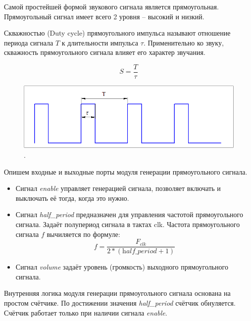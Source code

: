 Самой простейшей формой звукового сигнала является прямоугольная. Прямоугольный сигнал имеет всего 2 уровня -- высокий и низкий. 


Скважностью (Duty cycle) прямоугольного импульса называют отношение периода сигнала $T$ к длительности импульса $\tau$. Применительно ко звуку, скважность прямоугольного сигнала влияет его характер звучания.

$$ S = \frac{T}{\tau} $$


\begin{figure}[H]
	\centering
	\includegraphics [width=1\textwidth] {images/lab_7/duty_cycle.png}
	\caption{.}
	\label{lab7:pic4}
\end{figure}


Опишем входные и выходные порты модуля генерации прямоугольного сигнала.

\noindent
\begin{minipage}{\linewidth}
	
\end{minipage}

\begin{itemize}
	\item Сигнал \textit{enable} управляет генерацией сигнала, позволяет включать и выключать её тогда, когда это нужно.
	\item Сигнал \textit{half\_period} предназначен для управления частотой прямоугольного сигнала. Задаёт полупериод сигнала в тактах clk. Частота прямоугольного сигнала $f$ вычиляется по формуле: 
	$$ f = \frac{F_{clk}}{2* (\textit{half\_period} + 1)} $$
	\item Сигнал \textit{volume} задаёт уровень (громкость) выходного прямоугольного сигнала.

\end{itemize}


Внутренняя логика модуля генерации прямоугольного сигнала основана на простом счётчике. По достижении значения \textit{half\_period} счётчик обнуляется. Счётчик работает только при наличии сигнала \textit{enable}.

